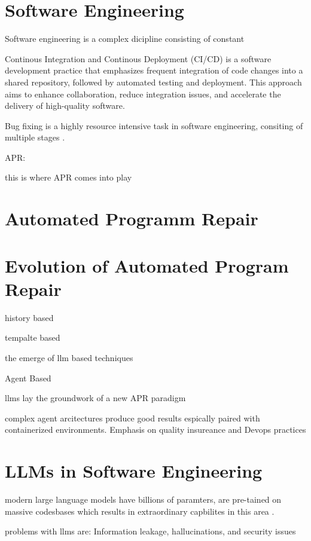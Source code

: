 \section{Software Engineering}
Software engineering is a complex dicipline consisting of constant


Continous Integration and Continous Deployment (CI/CD) is a software development practice that emphasizes frequent integration of code changes into a shared repository, followed by automated testing and deployment. This approach aims to enhance collaboration, reduce integration issues, and accelerate the delivery of high-quality software.

Bug fixing is a highly resource intensive task in software engineering, consiting of multiple stages .

APR:

this is where APR comes into play
\section{Automated Programm Repair}

\section{Evolution of Automated Program Repair}



history based

tempalte based

the emerge of llm based techniques

Agent Based

llms lay the groundwork of a new APR paradigm \cite{chenUnveilingPitfallsUnderstanding2025}

complex agent arcitectures produce good results espically paired with containerized environments. Emphasis on quality insureance and Devops practices \cite{puvvadiCodingAgentsComprehensive2025}


\section{LLMs in Software Engineering}

modern large language models have billions of paramters, are pre-tained on massive codesbases which results in extraordinary capbilites in this area  \cite{chenUnveilingPitfallsUnderstanding2025}.

problems with llms are: Information leakage, hallucinations, and security issues

